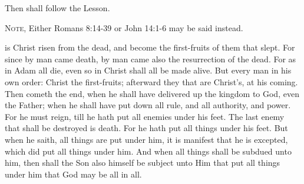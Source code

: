 \begin{rubric}
	Then shall follow the Lesson.
\end{rubric}
\begin{rubric}
	\textsc{Note,} Either Romans 8:14-39 or John 14:1-6 may be said instead.
\end{rubric}
 is Christ risen from the dead, and become the first-fruits of them that slept. For since by man came death, by man came also the resurrection of the dead. For as in Adam all die, even so in Christ shall all be made alive. But every man in his own order: Christ the first-fruits; afterward they that are Christ's, at his coming. Then cometh the end, when he shall have delivered up the kingdom to God, even the Father; when he shall have put down all rule, and all authority, and power. For he must reign, till he hath put all enemies under his feet. The last enemy that shall be destroyed is death. For he hath put all things under his feet. But when he saith, all things are put under him, it is manifest that he is excepted, which did put all things under him. And when all things shall be subdued unto him, then shall the Son also himself be subject unto Him that put all things under him that God may be all in all.\par
